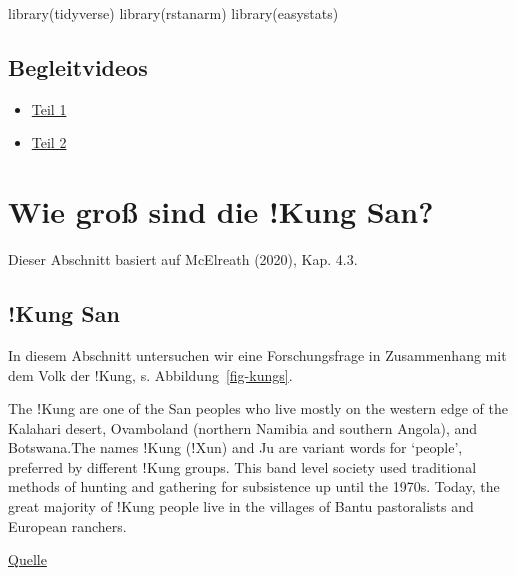 \documentclass[
  a4paper,
  DIV=11]{scrreprt}
\newenvironment{Shaded}{\begin{snugshade}}{\end{snugshade}}
\newcommand{\FunctionTok}[1]{\textcolor[rgb]{0.28,0.35,0.67}{#1}}
\newcommand{\NormalTok}[1]{\textcolor[rgb]{0.00,0.23,0.31}{#1}}
\providecommand{\tightlist}{%
  \setlength{\itemsep}{0pt}\setlength{\parskip}{0pt}}\usepackage{longtable,booktabs,array}
\theoremstyle{definition}
\theoremstyle{remark}
\begin{document}
\begin{Shaded}
\begin{Highlighting}[]
\FunctionTok{library}\NormalTok{(tidyverse)}
\FunctionTok{library}\NormalTok{(rstanarm)}
\FunctionTok{library}\NormalTok{(easystats)}
\end{Highlighting}
\end{Shaded}

\hypertarget{begleitvideos-5}{%
\subsection{Begleitvideos}\label{begleitvideos-5}}

\begin{itemize}
\tightlist
\item
  \href{https://youtu.be/cYHArln1DkM}{Teil 1}
\item
  \href{https://youtu.be/qIuu-4qRT_0}{Teil 2}
\end{itemize}

\hypertarget{wie-grouxdf-sind-die-kung-san}{%
\section{Wie groß sind die !Kung
San?}\label{wie-grouxdf-sind-die-kung-san}}

Dieser Abschnitt basiert auf McElreath (2020), Kap. 4.3.

\hypertarget{kung-san}{%
\subsection{!Kung San}\label{kung-san}}

In diesem Abschnitt untersuchen wir eine Forschungsfrage in Zusammenhang
mit dem Volk der !Kung, s. Abbildung~\ref{fig-kungs}.

The ǃKung are one of the San peoples who live mostly on the western edge
of the Kalahari desert, Ovamboland (northern Namibia and southern
Angola), and Botswana.The names ǃKung (ǃXun) and Ju are variant words
for `people', preferred by different ǃKung groups. This band level
society used traditional methods of hunting and gathering for
subsistence up until the 1970s. Today, the great majority of ǃKung
people live in the villages of Bantu pastoralists and European ranchers.

\href{https://en.wikipedia.org/wiki/\%C7\%83Kung_people}{Quelle}
\end{document}
